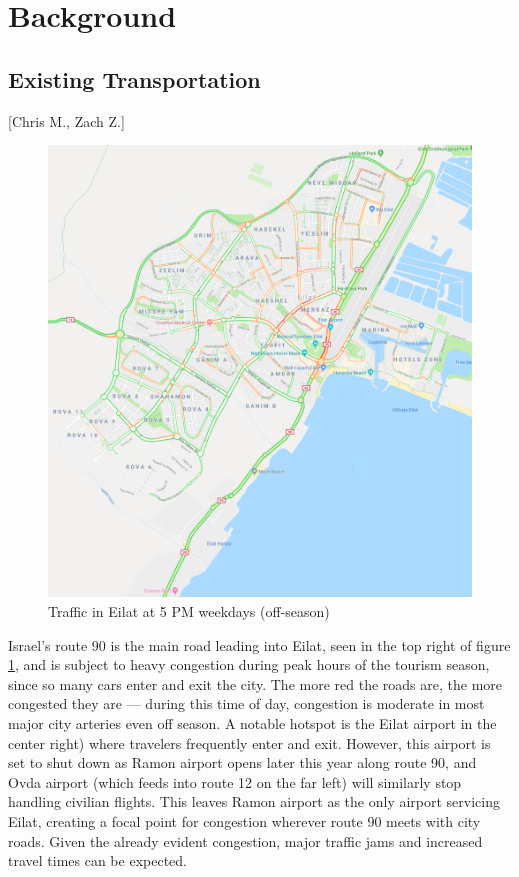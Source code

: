 \documentclass[12pt]{article}                         %
\begin{document}
\newpage
\section{Background}

\subsection{Existing Transportation}[Chris M., Zach Z.]

\begin{figure}[h]
    \centering
    \includegraphics[scale=1]{eilat_traffic.png}
    \caption{Traffic in Eilat at 5 PM weekdays (off-season)}
    \label{img:eilatTraffic}
\end{figure}

Israel's route 90 is the main road leading into Eilat, seen in the top right of figure \ref{img:eilatTraffic}, and is subject to heavy congestion during peak hours of the tourism season, since so many cars enter and exit the city. The more red the roads are, the more congested they are --- during this time of day, congestion is moderate in most major city arteries even off season. A notable hotspot is the Eilat airport in the center right) where travelers frequently enter and exit. However, this airport is set to shut down as Ramon airport opens later this year along route 90, and Ovda airport (which feeds into route 12 on the far left) will similarly stop handling civilian flights. This leaves Ramon airport as the only airport servicing Eilat, creating a focal point for congestion wherever route 90 meets with city roads. Given the already evident congestion, major traffic jams and increased travel times can be expected.
\end{document}
